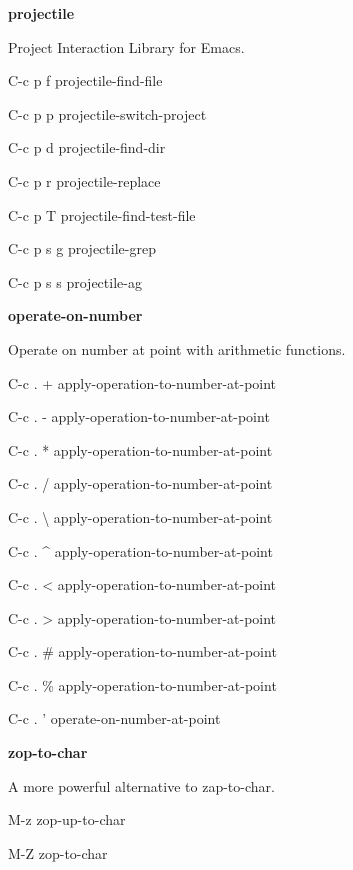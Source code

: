 \documentclass[10pt]{article}
\renewcommand\subsection[1]{\smallskip\par\textbf{\color{heading}#1}}
\newcommand\humanreadable[1]{{\par\color{default}\small\sffamily#1}}
\begin{document}
\begin{multicols}{4}
  \subsection{projectile}
  \humanreadable{Project Interaction Library for Emacs.}
  \begin{keylist}
  \item[C-c p f] projectile-find-file
  \item[C-c p p] projectile-switch-project
  \item[C-c p d] projectile-find-dir
  \item[C-c p r] projectile-replace
  \item[C-c p T] projectile-find-test-file
  \item[C-c p s g] projectile-grep
  \item[C-c p s s] projectile-ag
  \end{keylist}

  \subsection{operate-on-number}
  \humanreadable{Operate on number at point with arithmetic functions.}
  \begin{keylist}
  \item[C-c . +] apply-operation-to-number-at-point
  \item[C-c . -] apply-operation-to-number-at-point
  \item[C-c . *] apply-operation-to-number-at-point
  \item[C-c . /] apply-operation-to-number-at-point
  \item[C-c . \textbackslash] apply-operation-to-number-at-point
  \item[C-c . \textasciicircum] apply-operation-to-number-at-point
  \item[C-c . <] apply-operation-to-number-at-point
  \item[C-c . >] apply-operation-to-number-at-point
  \item[C-c . \#] apply-operation-to-number-at-point
  \item[C-c . \%] apply-operation-to-number-at-point
  \item[C-c . '] operate-on-number-at-point
  \end{keylist}

  \subsection{zop-to-char}
  \humanreadable{A more powerful alternative to zap-to-char.}
  \begin{keylist}
  \item[M-z] zop-up-to-char
  \item[M-Z] zop-to-char
  \end{keylist}


\end{multicols}
\end{document}
